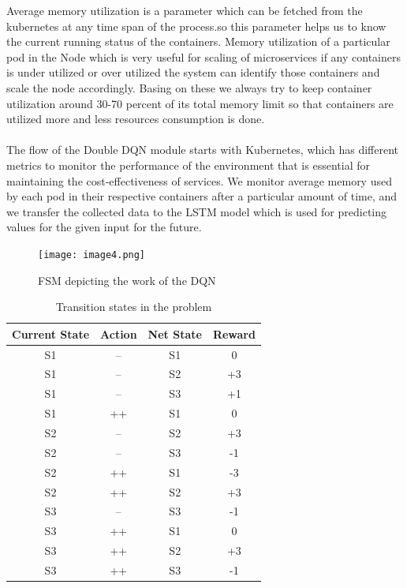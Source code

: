 \documentclass[conference]{IEEEtran}
\begin{document}
Average memory utilization is a parameter which can be fetched from the kubernetes at any time span of the process.so this parameter helps us to know the current running status of the containers. Memory utilization of a particular pod in the Node which is very useful for scaling of microservices if any containers is under utilized or over utilized the system can identify those containers and scale the node accordingly.
Basing on these we always try to keep container utilization around 30-70 percent of its total memory limit so that containers are utilized more and less resources consumption is done. \\ \\
The flow of the Double DQN module starts with Kubernetes, which has different metrics to monitor the performance of the environment that is essential for maintaining the cost-effectiveness of services. We monitor average memory used by each pod in their respective containers after a particular amount of time, and we transfer the collected data to the LSTM model which is used for predicting values for the given input for the future. \\

\begin{figure}[htbp]
\centerline{\texttt{[image: image4.png]}}
\caption{FSM depicting the work of the DQN}
\label{fig}
\end{figure}

\begin{table}[htbp]
\caption{Transition states in the problem}
\begin{center}
\begin{tabular}{ |c|c|c|C| } 
 \hline
 Current State & Action & Net State & Reward \\ 
\hline
 S1 & -- & S1 & 0 \\ 
 \hline
 S1 & -- & S2 & +3 \\ 
 \hline
 S1 & -- & S3 & +1 \\ 
\hline
 S1 & ++ & S1 & 0 \\ 
 \hline
 S2 & -- & S2 & +3 \\ 
 \hline
 S2 & -- & S3 & -1 \\ 
 \hline
 S2 & ++ & S1 & -3 \\ 
 \hline
 S2 & ++ & S2 & +3 \\ 
 \hline
 S3 & -- & S3 & -1 \\ 
\hline
 S3 & ++ & S1 & 0 \\ 
 \hline
 S3 & ++ & S2 & +3 \\ 
 \hline
 S3 & ++ & S3 & -1 \\ 
 \hline
\end{tabular}
\label{tab1}
\end{center}
\end{table}
\end{document}
